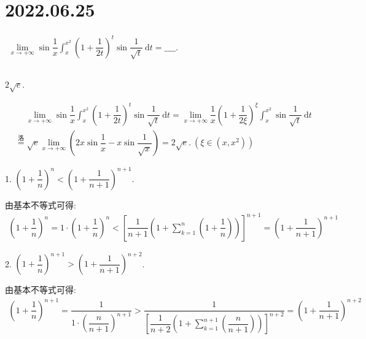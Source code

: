 \documentclass[lang=cn,12pt]{elegantbook}
\begin{document}
\section*{2022.06.25}

$
\begin{aligned}
  \lim\limits_{x \to +\infty} \sin\dfrac{1}{x}\int_{x}^{x^2} 
    \left(1+\dfrac{1}{2t}\right)^t \sin \dfrac{1}{\sqrt{t}} \mathrm{~d} t = \_\_\_\_.
\end{aligned}$
\\ \\

\begin{solution}
  $2\sqrt{e}.$

  $\begin{aligned}
    &\quad\ 
    \lim\limits_{x \to +\infty} \sin\dfrac{1}{x}\int_{x}^{x^2} 
      \left(1+\dfrac{1}{2t}\right)^t \sin \dfrac{1}{\sqrt{t}} \mathrm{~d} t =
    \lim\limits_{x \to +\infty} \dfrac{1}{x} \left(1+\dfrac{1}{2\xi}\right)^{\xi}\int_{x}^{x^2} 
      \sin \dfrac{1}{\sqrt{t}} \mathrm{~d} t \\ &\overset{洛}{=}
    \sqrt{e}\lim\limits_{x \to +\infty} \left(
      2x\sin\dfrac{1}{x} - x\sin\dfrac{1}{\sqrt{x}}\right) = 2\sqrt{e}. \ (\xi \in (x, x^2))
  \end{aligned}
  $
\end{solution}


\newpage



1. $\left(1+\dfrac{1}{n}\right)^n < \left(1 + \dfrac{1}{n+1}\right)^{n+1}$.
\newline

\begin{solution}
  由基本不等式可得:
  $$\begin{aligned}
  \left(1+\dfrac{1}{n}\right)^n = 1 \cdot \left(1+\dfrac{1}{n}\right)^n
  < \left[\dfrac{1}{n+1}\left(1+\sum_{k=1}^{n}\left(1 + \dfrac{1}{n}\right)\right)\right]^{n+1}
  = \left(1+\dfrac{1}{n+1}\right)^{n+1}
  \end{aligned}$$
\end{solution}

\vspace{1cm}
2. $\left(1+\dfrac{1}{n}\right)^{n+1} > \left(1 + \dfrac{1}{n+1}\right)^{n+2}$.
\newline

\begin{solution}
  由基本不等式可得:
  $$\begin{aligned}
    \left(1+\dfrac{1}{n}\right)^{n+1} = \dfrac{1}{1 \cdot \left(\dfrac{n}{n+1}\right)^{n+1}}
    > \dfrac{1}{\left[\dfrac{1}{n+2}\left(1+\displaystyle\sum_{k=1}^{n+1}
      \left(\dfrac{n}{n+1}\right)\right)\right]^{n+2}}
    = \left(1 + \dfrac{1}{n+1}\right)^{n+2}
  \end{aligned}$$
\end{solution}
\end{document}
